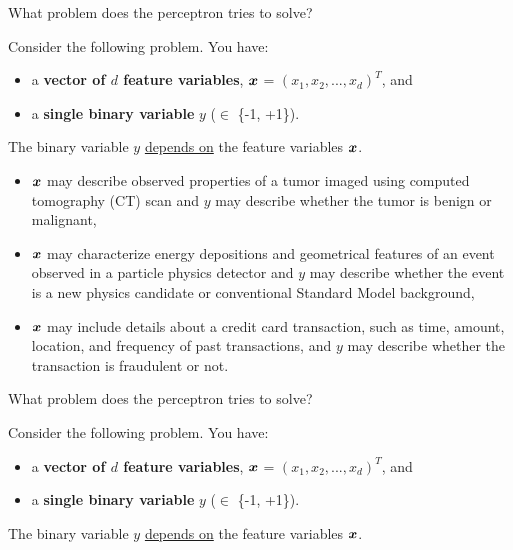 \begin{frame}[t]{What problem does the perceptron tries to solve?}

    Consider the following problem. You have:
    \begin{itemize}
        \item a {\bf vector of $d$ feature variables}, $\boldsymbol{x}$ = $(x_1, x_2, ..., x_d)^T$, and
        \item a {\bf single binary variable} $y$ ($\in$ \{-1, +1\}).   
    \end{itemize}
    The binary variable $y$ \underline{depends on} the feature variables $\boldsymbol{x}$.\\
    \vspace{0.2cm}

    \begin{blockexample}{}
    \begin{itemize}
        \small
        \item 
        $\boldsymbol{x}$ may describe observed properties of a tumor imaged 
        using computed tomography (CT) scan and 
        $y$ may describe whether the tumor is benign or malignant,
        \item 
        $\boldsymbol{x}$ may characterize energy depositions and geometrical features of 
        an event observed in a particle physics detector and 
        $y$ may describe whether the event is a new physics candidate 
        or conventional Standard Model background,
        \item 
        $\boldsymbol{x}$ may include details about a credit card transaction, such
        as time, amount, location, and frequency of past transactions, and 
        $y$ may describe whether the transaction is fraudulent or not.
    \end{itemize}
\end{blockexample}

\end{frame}

%
%
%

\begin{frame}[t]{What problem does the perceptron tries to solve?}

    Consider the following problem. You have:
    \begin{itemize}
        \item a {\bf vector of $d$ feature variables}, $\boldsymbol{x}$ = $(x_1, x_2, ..., x_d)^T$, and
        \item a {\bf single binary variable} $y$ ($\in$ \{-1, +1\}).   
    \end{itemize}
    The binary variable $y$ \underline{depends on} the feature variables $\boldsymbol{x}$.\\
    \vspace{0.2cm}
    

\end{frame}

